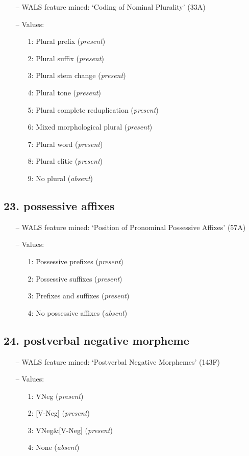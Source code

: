 \begin{itemize}
\item[--] WALS feature mined: `Coding of Nominal Plurality' (33A)
\item[--] Values:

\begin{enumerate}
\item[1:] Plural prefix (\emph{present})
\item[2:] Plural suffix (\emph{present})
\item[3:] Plural stem change (\emph{present})
\item[4:] Plural tone (\emph{present})
\item[5:] Plural complete reduplication (\emph{present})
\item[6:] Mixed morphological plural (\emph{present})
\item[7:] Plural word (\emph{present})
\item[8:] Plural clitic (\emph{present})
\item[9:] No plural (\emph{absent})
\end{enumerate}
\end{itemize}

\subsection*{23. possessive affixes}

\begin{itemize}
\item[--] WALS feature mined: `Position of Pronominal Possessive Affixes' (57A)
\item[--] Values:

\begin{enumerate}
\item[1:] Possessive prefixes (\emph{present})
\item[2:] Possessive suffixes (\emph{present})
\item[3:] Prefixes and suffixes (\emph{present})
\item[4:] No possessive affixes (\emph{absent})
\end{enumerate}
\end{itemize}

\subsection*{24. postverbal negative morpheme}

\begin{itemize}
\item[--] WALS feature mined: `Postverbal Negative Morphemes' (143F)
\item[--] Values:

\begin{enumerate}
\item[1:] VNeg (\emph{present})
\item[2:] [V-Neg] (\emph{present})
\item[3:] VNeg\&[V-Neg] (\emph{present})
\item[4:] None (\emph{absent})
\end{enumerate}
\end{itemize}

